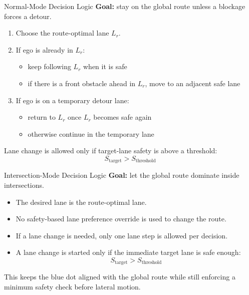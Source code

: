 \documentclass{beamer}
\begin{document}
\begin{frame}{Normal-Mode Decision Logic}
  \textbf{Goal:} stay on the global route unless a blockage forces a detour.

  \begin{enumerate}
    \item Choose the route-optimal lane \(L_r\).
    \item If ego is already in \(L_r\):
    \begin{itemize}
      \item keep following \(L_r\) when it is safe
      \item if there is a front obstacle ahead in \(L_r\), move to an adjacent safe lane
    \end{itemize}
    \item If ego is on a temporary detour lane:
    \begin{itemize}
      \item return to \(L_r\) once \(L_r\) becomes safe again
      \item otherwise continue in the temporary lane
    \end{itemize}
  \end{enumerate}

  Lane change is allowed only if target-lane safety is above a threshold:
  \[
    S_{\text{target}} > S_{\text{threshold}}
  \]
\end{frame}

\begin{frame}{Intersection-Mode Decision Logic}
  \textbf{Goal:} let the global route dominate inside intersections.

  \begin{itemize}
    \item The desired lane is the route-optimal lane.
    \item No safety-based lane preference override is used to change the route.
    \item If a lane change is needed, only one lane step is allowed per decision.
    \item A lane change is started only if the immediate target lane is safe enough:
    \[
      S_{\text{target}} > S_{\text{threshold}}
    \]
  \end{itemize}

  This keeps the blue dot aligned with the global route while still enforcing a
  minimum safety check before lateral motion.
\end{frame}
\end{document}

